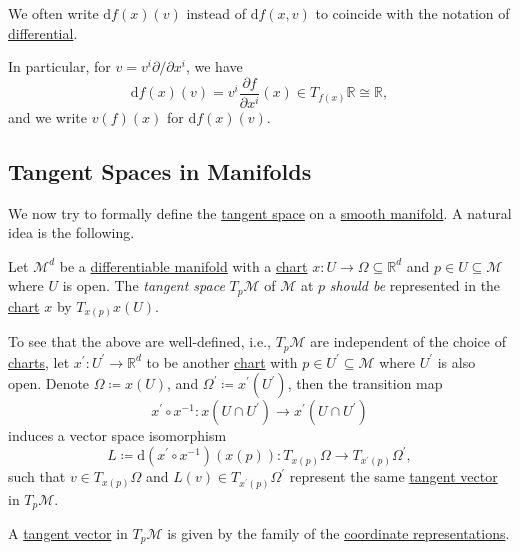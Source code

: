 \begin{notation}
	We often write \(\mathrm{d} f(x)(v)\) instead of \(\mathrm{d} f(x, v)\) to coincide with the notation of \hyperref[def:differential-of-Euclidean-space]{differential}.
\end{notation}

In particular, for \(v = v^i \partial / \partial x^i\), we have
\[
	\mathrm{d} f(x)(v) = v^i \frac{\partial f}{\partial x^i} (x)\in T_{f(x)}\mathbb{R} \cong \mathbb{R},
\]
and we write \(v(f)(x)\) for \(\mathrm{d} f(x)(v)\).

\subsection{Tangent Spaces in Manifolds}
We now try to formally define the \hyperref[def:tangent-space]{tangent space} on a \hyperref[def:smooth-manifold]{smooth manifold}. A natural idea is the following.

\begin{intuition}
	Let \(\mathcal{M}^d \) be a \hyperref[def:smooth-manifold]{differentiable manifold} with a \hyperref[def:coordinate-chart]{chart} \(x\colon U \to \Omega \subseteq \mathbb{R} ^d\) and \(p\in U \subseteq \mathcal{M} \) where \(U\) is open. The \emph{tangent space} \(T_p \mathcal{M} \) of \(\mathcal{M} \) at \(p\) \emph{should be} represented in the \hyperref[def:coordinate-chart]{chart} \(x\) by \(T_{x(p)}x(U)\).
\end{intuition}

To see that the above are well-defined, i.e., \(T_p \mathcal{M} \) are independent of the choice of \hyperref[def:coordinate-chart]{charts}, let \(x^\prime \colon U^\prime \to \mathbb{R} ^d\) to be another \hyperref[def:coordinate-chart]{chart} with \(p\in U^\prime \subseteq \mathcal{M} \) where \(U^\prime \) is also open. Denote \(\Omega \coloneqq x(U)\), and \(\Omega ^\prime \coloneqq x^\prime (U^\prime )\), then the transition map
\[
	x^\prime \circ x^{-1} \colon x(U \cap U^\prime )\to x^\prime (U \cap U^\prime )
\]
induces a vector space isomorphism
\[
	L\coloneqq \mathrm{d} (x^\prime \circ x ^{-1} )(x(p)) \colon T_{x(p)}\Omega \to T_{x^\prime (p)}\Omega ^\prime,
\]
such that \(v\in T_{x(p)}\Omega \) and \(L(v)\in T_{x^\prime (p)}\Omega ^\prime \) represent the same \hyperref[def:tangent-vector]{tangent vector} in \(T_p \mathcal{M} \).

\begin{remark}
	A \hyperref[def:tangent-vector]{tangent vector} in \(T_p \mathcal{M} \) is given by the family of the \hyperref[def:coordinate-chart]{coordinate representations}.
\end{remark}

